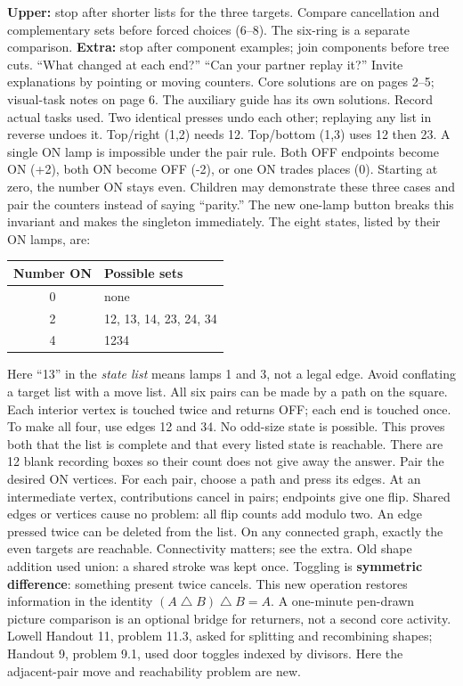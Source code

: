 \documentclass[12pt]{extarticle}
\begin{document}
\textbf{Upper:} stop after shorter lists for the three targets. Compare cancellation and complementary sets before forced choices (6--8). The six-ring is a separate comparison. \textbf{Extra:} stop after component examples; join components before tree cuts.
``What changed at each end?'' ``Can your partner replay it?'' Invite explanations by pointing or moving counters. Core solutions are on pages 2--5; visual-task notes on page 6. The auxiliary guide has its own solutions. Record actual tasks used.
\newpage
{}
Two identical presses undo each other; replaying any list in reverse undoes it. Top/right (1,2) needs 12. Top/bottom (1,3) uses 12 then 23. A single ON lamp is impossible under the pair rule. Both OFF endpoints become ON (+2), both ON become OFF (-2), or one ON trades places (0). Starting at zero, the number ON stays even. Children may demonstrate these three cases and pair the counters instead of saying ``parity.'' The new one-lamp button breaks this invariant and makes the singleton immediately.
The eight states, listed by their ON lamps, are:
\begin{center}\begin{tabular}{c|l}Number ON&Possible sets\\\hline 0&none\\2&12, 13, 14, 23, 24, 34\\4&1234\end{tabular}\end{center}
Here ``13'' in the \emph{state list} means lamps 1 and 3, not a legal edge. Avoid conflating a target list with a move list. All six pairs can be made by a path on the square. Each interior vertex is touched twice and returns OFF; each end is touched once. To make all four, use edges 12 and 34. No odd-size state is possible. This proves both that the list is complete and that every listed state is reachable. There are 12 blank recording boxes so their count does not give away the answer.
Pair the desired ON vertices. For each pair, choose a path and press its edges. At an intermediate vertex, contributions cancel in pairs; endpoints give one flip. Shared edges or vertices cause no problem: all flip counts add modulo two. An edge pressed twice can be deleted from the list. On any connected graph, exactly the even targets are reachable. Connectivity matters; see the extra.
Old shape addition used union: a shared stroke was kept once. Toggling is \textbf{symmetric difference}: something present twice cancels. This new operation restores information in the identity \((A\mathbin{\triangle}B)\mathbin{\triangle}B=A\). A one-minute pen-drawn picture comparison is an optional bridge for returners, not a second core activity. Lowell Handout 11, problem 11.3, asked for splitting and recombining shapes; Handout 9, problem 9.1, used door toggles indexed by divisors. Here the adjacent-pair move and reachability problem are new.
\end{document}
